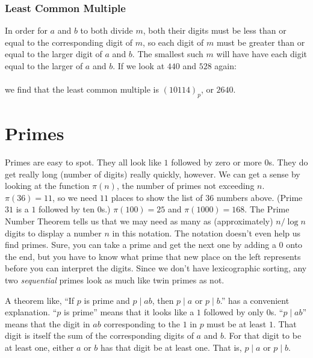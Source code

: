 \documentclass[12pt]{article}
\newcommand{\ppn}[1]{(#1)_p}
\begin{document}
\subsubsection*{Least Common Multiple}
In order for $a$ and $b$ to both divide $m$, both their digits must be less than or equal to the corresponding digit of $m$, so each digit of $m$ must be greater than or equal to the larger digit of $a$ and $b$. The smallest such $m$ will have have each digit equal to the larger of $a$ and $b$. If we look at $440$ and $528$ again:\\
\ttfamily \small
{}
\normalfont \normalsize \\
we find that the least common multiple is $\ppn{10114}$, or $2640$.

\section*{Primes}

Primes are easy to spot. They all look like $1$ followed by zero or more $0$s. They do get really long (number of digits) really quickly, however. We can get a sense by looking at the function $\pi(n)$, the number of primes not exceeding $n$. $\pi(36) = 11$, so we need $11$ places to show the list of $36$ numbers above. (Prime $31$ is a $1$ followed by ten $0$s.) $\pi(100) = 25$ and $\pi(1000) = 168$. The Prime Number Theorem tells us that we may need as many as (approximately) $n / \log n$ digits to display a number $n$ in this notation. The notation doesn't even help us find primes. Sure, you can take a prime and get the next one by adding a $0$ onto the end, but you have to know what prime that new place on the left represents before you can interpret the digits. Since we don't have lexicographic sorting, any two \textit{sequential} primes look as much like twin primes as not.

A theorem like, “If $p$ is prime and $p \mid ab$, then $p \mid a$ or $p \mid b$.” has a convenient explanation. “$p$ is prime” means that it looks like a $1$ followed by only $0$s. “$p \mid ab$” means that the digit in $ab$ corresponding to the $1$ in $p$ must be at least $1$. That digit is itself the sum of the corresponding digits of $a$ and $b$. For that digit to be at least one, either $a$ or $b$ has that digit be at least one. That is, $p \mid a$ or $p \mid b$.
\end{document}
